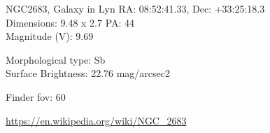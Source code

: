 \begin{block}{NGC2683, Galaxy in Lyn}
    RA: 08:52:41.33, Dec: +33:25:18.3 \\ 
    Dimensions: 9.48 x 2.7 PA: 44 \\ 
    Magnitude (V): 9.69

    Morphological type: Sb \\ 
    Surface Brightness: 22.76 mag/arcsec2 


    Finder fov: 60 

    \url{https://en.wikipedia.org/wiki/NGC_2683} 
\end{block}